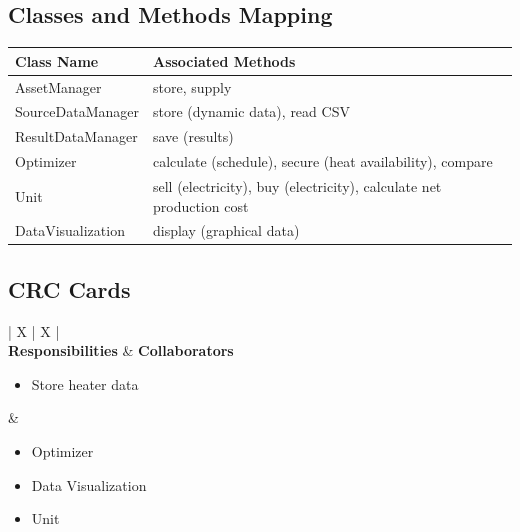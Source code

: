 \vspace{2em}

\subsection*{Classes and Methods Mapping}
\renewcommand{\arraystretch}{1.5} %
\begin{tabularx}{\textwidth}{@{} l X @{}}
    \toprule
    \textbf{Class Name} & \textbf{Associated Methods} \\
    \midrule
    \textcolor{nounred}{AssetManager} & \textcolor{verbblue}{store}, \textcolor{verbblue}{supply} \\
    \textcolor{nounred}{SourceDataManager} & \textcolor{verbblue}{store} (dynamic data), \textcolor{verbblue}{read} CSV \\
    \textcolor{nounred}{ResultDataManager} & \textcolor{verbblue}{save} (results) \\
    \textcolor{nounred}{Optimizer} & \textcolor{verbblue}{calculate} (schedule), \textcolor{verbblue}{secure} (heat availability), \textcolor{verbblue}{compare} \\
    \textcolor{nounred}{Unit} & \textcolor{verbblue}{sell} (electricity), \textcolor{verbblue}{buy} (electricity), \textcolor{verbblue}{calculate} net production cost \\
    \textcolor{nounred}{DataVisualization} & \textcolor{verbblue}{display} (graphical data) \\
    \bottomrule
\end{tabularx}

\subsection*{CRC Cards}
\noindent
\begin{tabularx}{\textwidth}{| X | X |}
    \hline
     \\
    \hline
    \textbf{Responsibilities} & \textbf{Collaborators} \\
    \hline
    \begin{itemize}[leftmargin=*, nosep, before=\vspace{-0.2\baselineskip}]
        \item Store heater data
    \end{itemize} & 
    \begin{itemize}[leftmargin=*, nosep, before=\vspace{-0.2\baselineskip}]
        \item Optimizer
        \item Data Visualization
        \item Unit
    \end{itemize} \\
    \hline
\end{tabularx}

